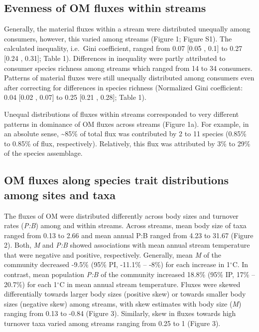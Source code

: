 \documentclass[
]{article}
\begin{document}
\hypertarget{evenness-of-om-fluxes-within-streams}{%
\subsection{Evenness of OM fluxes within
streams}\label{evenness-of-om-fluxes-within-streams}}

Generally, the material fluxes within a stream were distributed
unequally among consumers, however, this varied among streams (Figure 1;
Figure S1). The calculated inequality, i.e.~Gini coefficient, ranged
from 0.07 {[}0.05 , 0.1{]} to 0.27 {[}0.24 , 0.31{]}; Table 1).
Differences in inequality were partly attributed to consumer species
richness among streams which ranged from 14 to 34 consumers. Patterns of
material fluxes were still unequally distributed among consumers even
after correcting for differences in species richness (Normalized Gini
coefficient: 0.04 {[}0.02 , 0.07{]} to 0.25 {[}0.21 , 0.28{]}; Table 1).

Unequal distributions of fluxes within streams corresponded to very
different patterns in dominance of OM fluxes across streams (Figure 1a).
For example, in an absolute sense, \textasciitilde85\% of total flux was
contributed by 2 to 11 species (0.85\% to 0.85\% of flux, respectively).
Relatively, this flux was attributed by 3\% to 29\% of the species
assemblage.

\hypertarget{om-fluxes-along-species-trait-distributions-among-sites-and-taxa}{%
\subsection{OM fluxes along species trait distributions among sites and
taxa}\label{om-fluxes-along-species-trait-distributions-among-sites-and-taxa}}

The fluxes of OM were distributed differently across body sizes and
turnover rates (\emph{P:B}) among and within streams. Across streams,
mean body size of taxa ranged from 0.13 to 2.66 and mean annual P:B
ranged from 4.23 to 31.67 (Figure 2). Both, \emph{M} and \emph{P:B}
showed associations with mean annual stream temperature that were
negative and positive, respectively. Generally, mean \emph{M} of the
community decreased -9.5\% (95\% PI, -11.1\% -- -8\%) for each increase
in 1\(^\circ\)C. In contrast, mean population \emph{P:B} of the
community increased 18.8\% (95\% IP, 17\% -- 20.7\%) for each
1\(^\circ\)C in mean annual stream temperature. Fluxes were skewed
differentially towards larger body sizes (positive skew) or towards
smaller body sizes (negative skew) among streams, with skew estimates
with body size (\emph{M}) ranging from 0.13 to -0.84 (Figure 3).
Similarly, skew in fluxes towards high turnover taxa varied among
streams ranging from 0.25 to 1 (Figure 3).
\end{document}
